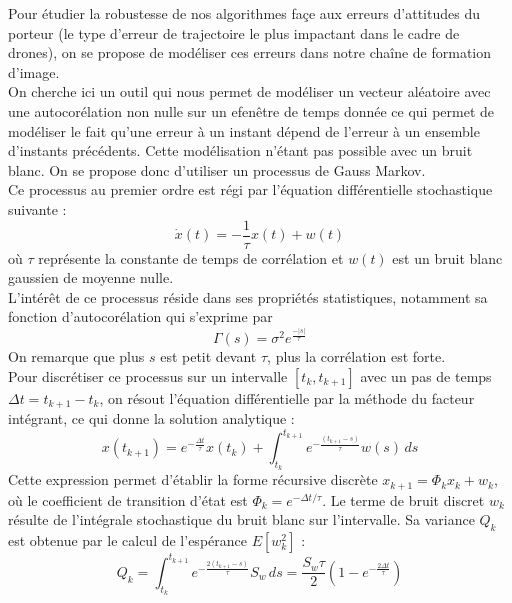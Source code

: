 Pour étudier la robustesse de nos algorithmes façe aux erreurs d'attitudes du porteur (le type d'erreur de trajectoire le plus impactant dans le cadre de drones), on se propose de modéliser ces erreurs dans notre chaîne de formation d'image. \\ 
On cherche ici un outil qui nous permet de modéliser un vecteur aléatoire avec une autocorélation non nulle sur un efenêtre de temps donnée ce qui permet de modéliser le fait qu'une erreur à un instant dépend de l'erreur à un ensemble d'instants précédents. Cette modélisation n'étant pas possible avec un bruit blanc. On se propose donc d'utiliser un processus de Gauss Markov. \\
Ce processus au premier ordre est régi par l'équation différentielle stochastique suivante :
\begin{equation}
    \dot{x}(t) = -\frac{1}{\tau} x(t) + w(t)
\end{equation}
où $\tau$ représente la constante de temps de corrélation et $w(t)$ est un bruit blanc gaussien de moyenne nulle.\\
L'intérêt de ce processus réside dans ses propriétés statistiques, notamment sa fonction d'autocorélation qui s'exprime par
\begin{equation}
    \Gamma(s) = \sigma^2e^{\frac{-|s|}{\tau}}
\end{equation}
On remarque que plus $s$ est petit devant $\tau$, plus la corrélation est forte. \\
Pour discrétiser ce processus sur un intervalle $[t_k, t_{k+1}]$ avec un pas de temps $\Delta t = t_{k+1} - t_k$, on résout l'équation différentielle par la méthode du facteur intégrant, ce qui donne la solution analytique :
\begin{equation}
    x(t_{k+1}) = e^{-\frac{\Delta t}{\tau}} x(t_k) + \int_{t_k}^{t_{k+1}} e^{-\frac{(t_{k+1}-s)}{\tau}} w(s) \, ds
\end{equation}
Cette expression permet d'établir la forme récursive discrète $x_{k+1} = \Phi_k x_k + w_k$, où le coefficient de transition d'état est $\Phi_k = e^{-\Delta t / \tau}$. Le terme de bruit discret $w_k$ résulte de l'intégrale stochastique du bruit blanc sur l'intervalle. Sa variance $Q_k$ est obtenue par le calcul de l'espérance $E[w_k^2]$ :
\begin{equation}
    Q_k = \int_{t_k}^{t_{k+1}} e^{-\frac{2(t_{k+1}-s)}{\tau}} S_w \, ds = \frac{S_w \tau}{2} \left( 1 - e^{-\frac{2\Delta t}{\tau}} \right)
\end{equation}

